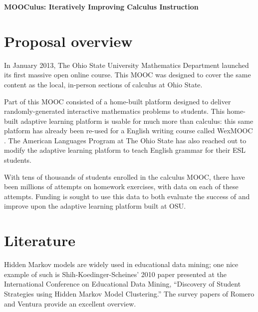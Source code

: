 \documentclass[12pt]{article}
\begin{document}
\begin{center}
  \textbf{MOOCulus: Iteratively Improving Calculus Instruction}
\end{center}

% 

\section{Proposal overview}

In January 2013, The Ohio State University Mathematics Department
launched its first massive open online course.  This MOOC was designed
to cover the same content as the local, in-person sections of calculus
at Ohio State.

Part of this MOOC consisted of a home-built platform designed to
deliver randomly-generated interactive mathematics problems to
students.  This home-built adaptive learning platform is usable for
much more than calculus: this same platform has already been re-used
for a English writing course called
WexMOOC \parencite{gates-foundation-grant}.  The American Languages
Program at The Ohio State has also reached out to modify the adaptive
learning platform to teach English grammar for their ESL students.

With tens of thousands of students enrolled in the calculus MOOC,
there have been millions of attempts on homework exercises, with data
on each of these attempts.  Funding is sought to use this data to both
evaluate the success of and improve upon the adaptive learning
platform built at OSU.

\section{Literature}

Hidden Markov models are widely used in educational data mining; one
nice example of such is Shih-Koedinger-Scheines' 2010 paper
presented at the International Conference on Educational Data Mining,
``Discovery of Student Strategies using Hidden Markov Model
Clustering.''  The survey papers of Romero and Ventura provide an
excellent overview.
\end{document}
